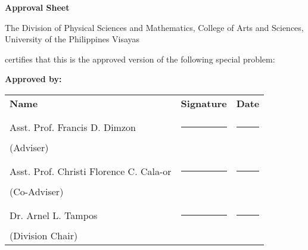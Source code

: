 \begin{center}
\textbf{Approval Sheet}
	
The Division of Physical Sciences and Mathematics, College of Arts and Sciences, University of the Philippines Visayas 

certifies that this is the approved version of the following special problem:

\end{center}

{\small\textbf{Approved by:}}

\newcommand{\signaturerule}{\rule{10em}{.4pt}}
\begin{tabular}{lll}
	\bfseries Name  & \bfseries Signature & \bfseries Date\\ \\
	Asst. Prof. Francis D. Dimzon &\signaturerule  & \signaturerule\\ 
	(Adviser)\\ \\
	Asst. Prof. Christi Florence C. Cala-or &\signaturerule &\signaturerule\\
	(Co-Adviser)\\ \\
	Dr. Arnel L. Tampos &\signaturerule &\signaturerule\\
	(Division Chair)
		
\end{tabular}
